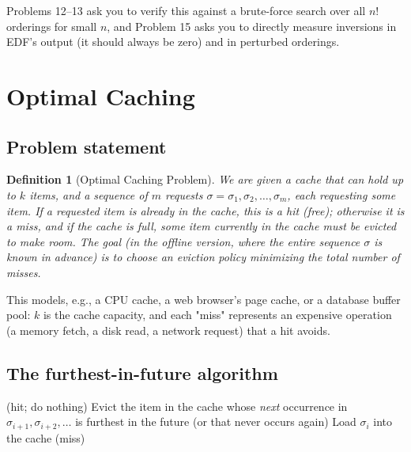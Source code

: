 \documentclass[11pt]{article}
\newtheorem{definition}[theorem]{Definition}
\begin{document}
Problems 12--13 ask you to verify this against a brute-force search over all $n!$
orderings for small $n$, and Problem 15 asks you to directly measure inversions in EDF's
output (it should always be zero) and in perturbed orderings.

\section{Optimal Caching}

\subsection{Problem statement}

\begin{definition}[Optimal Caching Problem]
We are given a cache that can hold up to $k$ items, and a sequence of $m$ requests $\sigma
= \sigma_1, \sigma_2, \ldots, \sigma_m$, each requesting some item. If a requested item is
already in the cache, this is a \emph{hit} (free); otherwise it is a \emph{miss}, and if
the cache is full, some item currently in the cache must be \emph{evicted} to make room.
The goal (in the \emph{offline} version, where the entire sequence $\sigma$ is known in
advance) is to choose an eviction policy minimizing the total number of misses.
\end{definition}

This models, e.g., a CPU cache, a web browser's page cache, or a database buffer pool:
$k$ is the cache capacity, and each "miss" represents an expensive operation (a memory
fetch, a disk read, a network request) that a hit avoids.

\subsection{The furthest-in-future algorithm}

\begin{algorithm}[h]
\caption{Furthest-In-Future (Belady's MIN / LFD)}
\begin{algorithmic}[1]
        \State (hit; do nothing)
    \Else
            \State Evict the item in the cache whose \emph{next} occurrence in
            $\sigma_{i+1}, \sigma_{i+2}, \ldots$ is furthest in the future (or
            that never occurs again)
        \EndIf
        \State Load $\sigma_i$ into the cache (miss)
    \EndIf
\EndFor
\end{algorithmic}
\end{algorithm}
\end{document}
